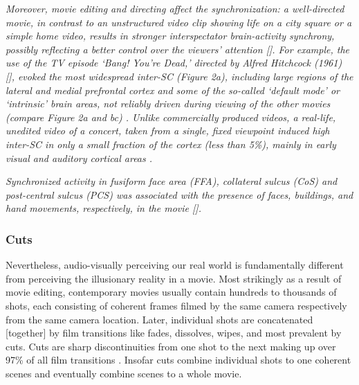 \documentclass[10pt,a4paper,twocolumn]{article}
\begin{document}
\emph{Moreover, movie editing and directing affect the synchronization:
	a well-directed movie, in contrast to an unstructured video clip showing
	life on a city square or a simple home video, results in stronger
	interspectator brain-activity synchrony, possibly reflecting a better
	control over the viewers' attention {[}\citet{hasson_2008_hierarchy_temporal_windows,malinen_2007_towards_natural_stimulation}{]}.
	For example, the use of the TV episode \textquoteleft Bang! You\textquoteright re
	Dead,\textquoteright{} directed by Alfred Hitchcock (1961) {[}\citet{hasson_2008_neurocinematics}{]},
	evoked the most widespread inter-SC (Figure 2a), including large regions
	of the lateral and medial prefrontal cortex and some of the so-called
	\textquoteleft default mode\textquoteright{} or \textquoteleft intrinsic\textquoteright{}
	brain areas, not reliably driven during viewing of the other movies
	(compare Figure 2a and b\textendash c) \citealp{hasson_2009_natural_stim_review}.
	Unlike commercially produced videos, a real-life, unedited video of
	a concert, taken from a single, fixed viewpoint induced high inter-SC
	in only a small fraction of the cortex (less than 5\%), mainly in
	early visual and auditory cortical areas \citep{hasson_2009_natural_stim_review}.}

\emph{Synchronized activity in fusiform face area (FFA), collateral
	sulcus (CoS) and post-central sulcus (PCS) was associated with the
	presence of faces, buildings, and hand movements, respectively, in
	the movie {[}\citet{hasson_2004_synchronization_natural_vision}{]}\citep{lankinen_2014_MEG_during_movie}.}


\subsubsection{Cuts }

Nevertheless, audio-visually perceiving our real world is fundamentally
different from perceiving the illusionary reality in a movie. Most
strikingly as a result of movie editing, contemporary movies usually
contain hundreds to thousands of shots, each consisting of coherent
frames filmed by the same camera respectively from the same camera
location. Later, individual shots are concatenated {[}together{]}
by film transitions like fades, dissolves, wipes, and most prevalent
by cuts. Cuts are sharp discontinuities from one shot to the next
making up over 97\% of all film transitions \citep{cutting_2011_changing_poetics_of_dissolve}.
Insofar cuts combine individual shots to one coherent scenes and eventually
combine scenes to a whole movie. 
\end{document}

